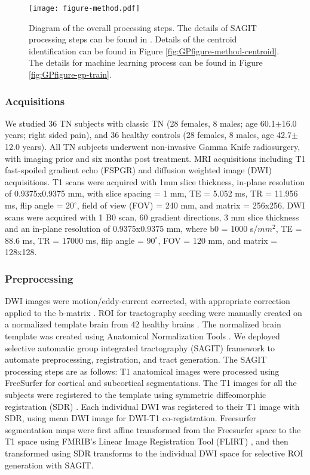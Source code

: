 \begin{figure}[ht]
\centering
\texttt{[image: figure-method.pdf]}
\caption{Diagram of the overall processing steps. The details of SAGIT processing steps can be found in \protect\cite{Chen2016}. Details of the centroid identification can be found in Figure \ref{fig:GPfigure-method-centroid}. The details for machine learning process can be found in Figure \ref{fig:GPfigure-gp-train}. }
\label{fig:GPMethods}
\end{figure}

\subsubsection{Acquisitions}
We studied 36 TN subjects with classic TN (28 females, 8 males; age 60.1$\pm$16.0 years; right sided pain), and 36 healthy controls (28 females, 8 males, age 42.7$\pm$12.0 years).  All TN subjects underwent non-invasive Gamma Knife radiosurgery, with imaging prior and six months post treatment. MRI acquisitions including T1 fast-spoiled gradient echo (FSPGR) and diffusion weighted image (DWI) acquisitions. 
T1 scans were acquired with 1mm slice thickness, in-plane resolution of 0.9375x0.9375 mm, with slice spacing = 1 mm, TE = 5.052 ms, TR = 11.956 ms, flip angle = $20^\circ$, field of view (FOV) = 240 mm, and matrix = 256x256. 
DWI scans were acquired with 1 B0 scan, 60 gradient directions, 3 mm slice thickness and an in-plane resolution of 0.9375x0.9375 mm, where b0 = 1000 s/$mm^2$, TE = 88.6 ms, TR = 17000 ms, flip angle = $90^\circ$, FOV = 120 mm, and matrix = 128x128.

\subsubsection{Preprocessing}
DWI images were motion/eddy-current corrected, with appropriate correction applied to the b-matrix \cite{Leemans2009}. ROI for tractography seeding were manually created on a normalized template brain from 42 healthy brains \cite{Chen2016}. The normalized brain template was created using Anatomical Normalization Tools \cite{Avants2010,Avants2011}. We deployed selective automatic group integrated tractography (SAGIT) framework \cite{Chen2016} to automate preprocessing, registration, and tract generation. The SAGIT processing steps are as follows: T1 anatomical images were processed using FreeSurfer \cite{Fischl2004} for cortical and subcortical segmentations. The T1 images for all the subjects were registered to the template using symmetric diffeomorphic registration (SDR) \cite{Avants2008b}. Each individual DWI was registered to their T1 image with SDR, using mean DWI image for DWI-T1 co-registration. Freesurfer segmentation maps were first affine transformed from the Freesurfer space to the T1 space using FMRIB's Linear Image Registration Tool (FLIRT) \cite{Jenkinson2001,Jenkinson2002}, and then transformed using SDR transforms to the individual DWI space for selective ROI generation with SAGIT.

